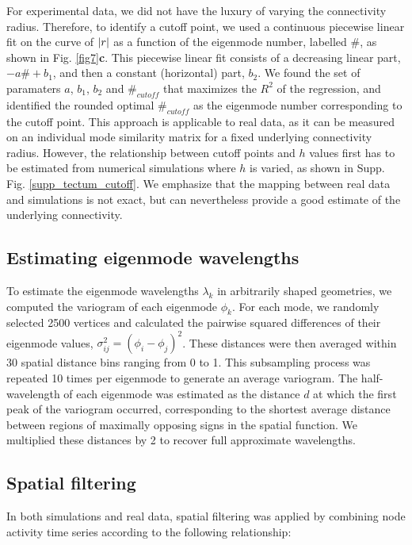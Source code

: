 \documentclass{article}
\begin{document}
For experimental data, we did not have the luxury of varying the connectivity radius. Therefore, to identify a cutoff point, we used a continuous piecewise linear fit on the curve of $\abs{r}$ as a function of the eigenmode number, labelled \#, as shown in Fig. \ref{fig7}\textbf{c}. This piecewise linear fit consists of a decreasing linear part, $-a\#+b_1$, and then a constant (horizontal) part, $b_2$. We found the set of paramaters $a$, $b_1$, $b_2$ and $\#_{cutoff}$ that maximizes the $R^2$ of the regression, and identified the rounded optimal $\#_{cutoff}$ as the eigenmode number corresponding to the cutoff point. This approach is applicable to real data, as it can be measured on an individual mode similarity matrix for a fixed underlying connectivity radius. However, the relationship between cutoff points and $h$ values first has to be estimated from numerical simulations where $h$ is varied, as shown in Supp. Fig. \ref{supp_tectum_cutoff}. We emphasize that the mapping between real data and simulations is not exact, but can nevertheless provide a good estimate of the underlying connectivity.

\subsection*{Estimating eigenmode wavelengths}

To estimate the eigenmode wavelengths $\lambda_k$ in arbitrarily shaped geometries, we computed the variogram of each eigenmode $\phi_k$. For each mode, we randomly selected 2500 vertices and calculated the pairwise squared differences of their eigenmode values, $\sigma^2_{ij}=(\phi_i - \phi_j)^2$. These distances were then averaged within 30 spatial distance bins ranging from 0 to 1. This subsampling process was repeated 10 times per eigenmode to generate an average variogram. The half-wavelength of each eigenmode was estimated as the distance $d$ at which the first peak of the variogram occurred, corresponding to the shortest average distance between regions of maximally opposing signs in the spatial function. We multiplied these distances by 2 to recover full approximate wavelengths.

\subsection*{Spatial filtering}

In both simulations and real data, spatial filtering was applied by combining node activity time series according to the following relationship:
\end{document}
